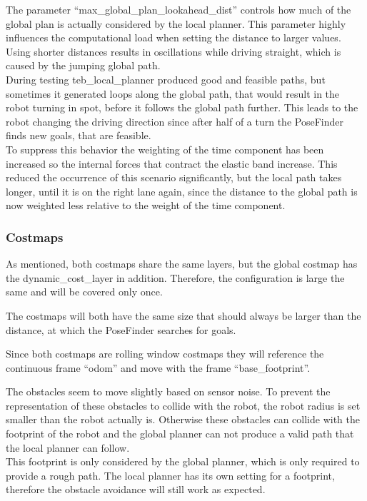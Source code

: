 The parameter ``max\_global\_plan\_lookahead\_dist'' controls how much of the global plan is actually considered by the local planner. This parameter highly influences the computational load when setting the distance to larger values. Using shorter distances results in oscillations while driving straight, which is caused by the jumping global path.\\

During testing teb\_local\_planner produced good and feasible paths, but sometimes it generated loops along the global path, that would result in the robot turning in spot, before it follows the global path further. This leads to the robot changing the driving direction since after half of a turn the PoseFinder finds new goals, that are feasible.\\

To suppress this behavior the weighting of the time component has been increased so the internal forces that contract the elastic band increase. This reduced the occurrence of this scenario significantly, but the local path takes longer, until it is on the right lane again, since the distance to the global path is now weighted less relative to the weight of the time component.

\subsubsection{Costmaps}

As mentioned, both costmaps share the same layers, but the global costmap has the dynamic\_cost\_layer in addition. Therefore, the configuration is large the same and will be covered only once.

The costmaps will both have the same size that should always be larger than the distance, at which the PoseFinder searches for goals.

Since both costmaps are rolling window costmaps they will reference the continuous frame ``odom'' and move with the frame ``base\_footprint''.

The obstacles seem to move slightly based on sensor noise. To prevent the representation of these obstacles to collide with the robot, the robot radius is set smaller than the robot actually is. Otherwise these obstacles can collide with the footprint of the robot and the global planner can not produce a valid path that the local planner can follow.\\

This footprint is only considered by the global planner, which is only required to provide a rough path. The local planner has its own setting for a footprint, therefore the obstacle avoidance will still work as expected.

